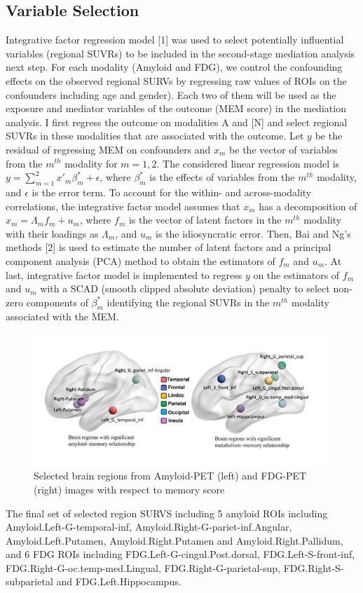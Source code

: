 \documentclass{article}
\begin{document}
\subsection{Variable Selection}
Integrative factor regression model [1] was used to select potentially influential variables (regional SUVRs) to be included in the second-stage mediation analysis next step. For each modality (Amyloid and FDG), we control the confounding effects on the observed regional SURVs by regressing raw values of ROIs on the confounders including age and gender). Each two of them will be used as the exposure and mediator variables of the outcome (MEM score) in the mediation analysis. I first regress the outcome on modalities A and [N] and select regional SUVRs in these modalities that are associated with the outcome. Let $y$ be the residual of regressing MEM on confounders and $x_m$ be the vector of variables from the $m^{th}$ modality for $m=1,2.$ The considered linear regression model is $y=\sum_{m=1}^2 x'_m\beta^*_m+\epsilon$, where $\beta^*_m$ is the effects of variables from the $m^{th}$ modality, and $\epsilon$ is the error term. To account for the within- and across-modality correlations, the integrative factor model assumes that $x_m$ has a decomposition of $x_m=\Lambda_mf_m+u_m$, where $f_m$ is the vector of latent factors in the $m^{th}$ modality with their loadings as $\Lambda_m$, and $u_m$ is the idiosyncratic error. Then, Bai and Ng's methods [2] is used to estimate the number of latent factors and a principal component analysis (PCA) method to obtain the estimators of $f_m$ and $u_m$. At last, integrative factor model is implemented to regress $y$ on the estimators of $f_m$ and $u_m$ with a SCAD (smooth clipped absolute deviation) penalty to select non-zero components of $\beta^*_m$ identifying the regional SUVRs in the $m^{th}$ modality associated with the MEM. 
\begin{figure}[h]
         \centering
         \includegraphics[scale=0.6]{Selected_Region.jpg}
         \caption{Selected brain regions from Amyloid-PET (left) and FDG-PET (right) images with respect to memory score}
\end{figure}
The final set of selected region SURVS including 5 amyloid ROIs including Amyloid.Left-G-temporal-inf, Amyloid.Right-G-pariet-inf.Angular, Amyloid.Left.Putamen, Amyloid.Right.Putamen and Amyloid.Right.Pallidum, and 6 FDG ROIs including FDG.Left-G-cingul.Post.dorsal, FDG.Left-S-front-inf, FDG.Right-G-oc.temp-med.Lingual, FDG.Right-G-parietal-sup, FDG.Right-S-subparietal and FDG.Left.Hippocampus.
\end{document}
